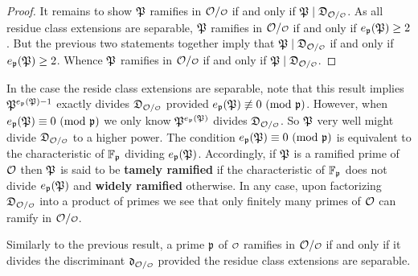 \begin{proof}
       It remains to show \(\mathfrak{P}\) ramifies in \(\mc{O}/\smc{O}\) if and only if \(\mf{P} \mid \mf{D}_{\mc{O}/\smc{O}}\). As all residue class extensions are separable, \(\mathfrak{P}\) ramifies in \(\mc{O}/\smc{O}\) if and only if \(e_{\mathfrak{p}}(\mathfrak{P}) \ge 2\). But the previous two statements together imply that \(\mf{P} \mid \mf{D}_{\mc{O}/\smc{O}}\) if and only if \(e_{\mathfrak{p}}(\mathfrak{P}) \ge 2\). Whence \(\mathfrak{P}\) ramifies in \(\mc{O}/\smc{O}\) if and only if \(\mf{P} \mid \mf{D}_{\mc{O}/\smc{O}}\).
    \end{proof}

    In the case the reside class extensions are separable, note that this result implies \(\mathfrak{P}^{e_{\mathfrak{p}}(\mathfrak{P})-1}\) exactly divides \(\mf{D}_{\mc{O}/\smc{O}}\) provided \(e_{\mathfrak{p}}(\mathfrak{P}) \not\equiv 0 \ (\mathrm{mod}\text{ }\mathfrak{p})\). However, when \(e_{\mathfrak{p}}(\mathfrak{P}) \equiv 0 \ (\mathrm{mod}\text{ }\mathfrak{p})\) we only know \(\mathfrak{P}^{e_{\mathfrak{p}}(\mathfrak{P})}\) divides \(\mf{D}_{\mc{O}/\smc{O}}\). So \(\mathfrak{P}\) very well might divide \(\mf{D}_{\mc{O}/\smc{O}}\) to a higher power. The condition \(e_{\mathfrak{p}}(\mathfrak{P}) \equiv 0 \ (\mathrm{mod}\text{ }\mathfrak{p})\) is equivalent to the characteristic of \(\mathbb{F}_{\mathfrak{p}}\) dividing \(e_{\mathfrak{p}}(\mathfrak{P})\). Accordingly, if \(\mathfrak{P}\) is a ramified prime of \(\mathcal{O}\) then \(\mathfrak{P}\) is said to be \textbf{tamely ramified} if the characteristic of \(\mathbb{F}_{\mathfrak{p}}\) does not divide \(e_{\mathfrak{p}}(\mathfrak{P})\) and \textbf{widely ramified} otherwise. In any case, upon factorizing \(\mf{D}_{\mc{O}/\smc{O}}\) into a product of primes we see that only finitely many primes of \(\mathcal{O}\) can ramify in \(\mc{O}/\smc{O}\).

    Similarly to the previous result, a prime \(\mathfrak{p}\) of \(\smc{O}\) ramifies in \(\mc{O}/\smc{O}\) if and only if it divides the discriminant \(\mf{d}_{\mc{O}/\smc{O}}\) provided the residue class extensions are separable.

